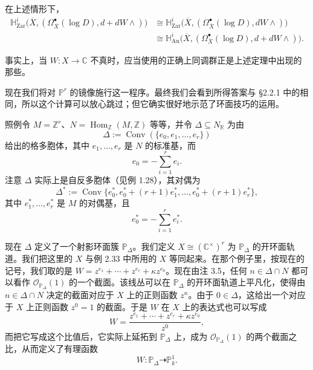 \begin{theorem}
在上述情形下，
\begin{align*}
  \mathbb{H}^i_{\mathrm{Zar}}\bigl(\overline{X},(\Omega^{\bullet}_{\overline{X}}(\log D),d+dW\wedge)\bigr)
  &\cong\mathbb{H}^i_{\mathrm{Zar}}\bigl(\overline{X},(\Omega^{\bullet}_{\overline{X}}(\log D),dW\wedge)\bigr)\\
  &\cong\mathbb{H}^i_{\mathrm{An}}\bigl(\overline{X},(\Omega^{\bullet}_{\overline{X}}(\log D),d+dW\wedge)\bigr).
\end{align*}
\end{theorem}


事实上，当 $W:X\to\mathbb{C}$ 不真时，应当使用的正确上同调群正是上述定理中出现的那些。

现在我们将对 $\mathbb{P}^r$ 的镜像施行这一程序。最终我们会看到所得答案与 §2.2.1 中的相同，所以这个计算可以放心跳过；但它确实很好地示范了环面技巧的运用。

照例令 $M=\mathbb{Z}^r$、$N=\operatorname{Hom}_{\mathbb{Z}}(M,\mathbb{Z})$ 等等，并令 $\Delta\subseteq N_{\mathbb{R}}$ 为由
\[
  \Delta:=\operatorname{Conv}(\{e_0,e_1,\dots,e_r\})
\]
给出的格多胞体，其中 $e_1,\dots,e_r$ 是 $N$ 的标准基，而
\[
  e_0=-\sum_{i=1}^{r}e_i.
\]
注意 $\Delta$ 实际上是自反多胞体（见例 1.28），其对偶为
\[
  \Delta^{*}:=\operatorname{Conv}\{e_0^{*},e_0^{*}+(r+1)e_1^{*},\dots,e_0^{*}+(r+1)e_r^{*}\},
\]
其中 $e_1^{*},\dots,e_r^{*}$ 是 $M$ 的对偶基，且
\[
  e_0^{*}=-\sum_{i=1}^{r}e_i^{*}.
\]

现在 $\Delta$ 定义了一个射影环面簇 $\mathbb{P}_{\Delta}$。我们定义 $X\cong(\mathbb{C}^{\times})^r$ 为 $\mathbb{P}_{\Delta}$ 的开环面轨道。我们把这里的 $X$ 与例 2.33 中所用的 $X$ 等同起来。在那个例子里，按现在的记号，我们取的是 $W=z^{e_1}+\cdots+z^{e_r}+\kappa z^{e_0}$。现在由注 3.5，任何 $n\in\Delta\cap N$ 都可以看作 $\mathcal{O}_{\mathbb{P}_{\Delta}}(1)$ 的一个截面。该线丛可以在 $\mathbb{P}_{\Delta}$ 的开环面轨道上平凡化，使得由 $n\in\Delta\cap N$ 决定的截面对应于 $X$ 上的正则函数 $z^n$。由于 $0\in\Delta$，这给出一个对应于 $X$ 上正则函数 $z^0=1$ 的截面。于是 $W$ 在 $X$ 上的表达式也可以写成
\[
  W=\frac{z^{e_1}+\cdots+z^{e_r}+\kappa z^{e_0}}{z^0},
\]
而把它写成这个比值后，它实际上延拓到 $\mathbb{P}_{\Delta}$ 上，成为 $\mathcal{O}_{\mathbb{P}_{\Delta}}(1)$ 的两个截面之比，从而定义了有理函数
\[
  W:\mathbb{P}_{\Delta}\dashrightarrow\mathbb{P}^1_k.
\]


